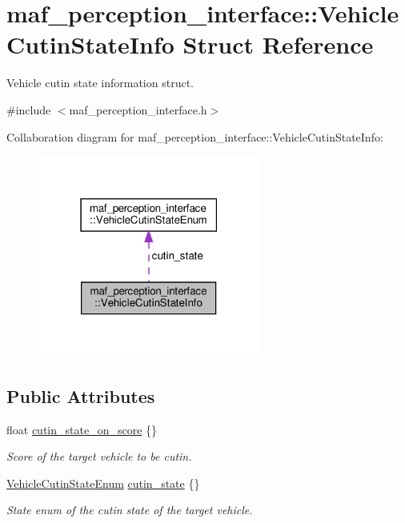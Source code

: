 \hypertarget{structmaf__perception__interface_1_1VehicleCutinStateInfo}{}\section{maf\+\_\+perception\+\_\+interface\+:\+:Vehicle\+Cutin\+State\+Info Struct Reference}
\label{structmaf__perception__interface_1_1VehicleCutinStateInfo}


Vehicle cutin state information struct.  




{\ttfamily \#include $<$maf\+\_\+perception\+\_\+interface.\+h$>$}



Collaboration diagram for maf\+\_\+perception\+\_\+interface\+:\+:Vehicle\+Cutin\+State\+Info\+:\nopagebreak
\begin{figure}[H]
\begin{center}
\leavevmode
\includegraphics[width=207pt]{structmaf__perception__interface_1_1VehicleCutinStateInfo__coll__graph}
\end{center}
\end{figure}
\subsection*{Public Attributes}
\begin{DoxyCompactItemize}
\item 
float \hyperlink{structmaf__perception__interface_1_1VehicleCutinStateInfo_a2adb6cc1a7d630ecbfd092b07197a802}{cutin\+\_\+state\+\_\+on\+\_\+score} \{\}
\begin{DoxyCompactList}\small\item\em Score of the target vehicle to be cutin. \end{DoxyCompactList}\item 
\hyperlink{structmaf__perception__interface_1_1VehicleCutinStateEnum}{Vehicle\+Cutin\+State\+Enum} \hyperlink{structmaf__perception__interface_1_1VehicleCutinStateInfo_afda179a5f33ab7d7f4e7d22481a037e0}{cutin\+\_\+state} \{\}
\begin{DoxyCompactList}\small\item\em State enum of the cutin state of the target vehicle. \end{DoxyCompactList}\end{DoxyCompactItemize}


